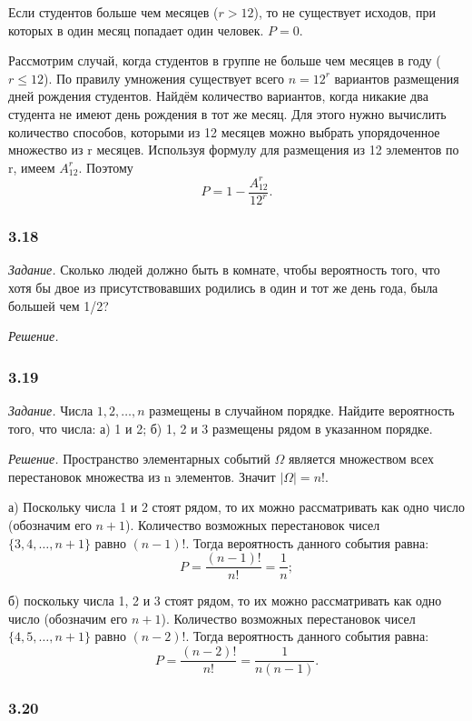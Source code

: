 \documentclass{book}
\begin{document}
Если студентов больше чем месяцев ($r>12$), то не существует исходов, при которых в один месяц попадает один человек. $P=0$.

Рассмотрим случай, когда студентов в группе не больше чем месяцев в году ($r\leq 12$). По правилу умножения существует всего $n=12^r$ вариантов размещения дней рождения студентов. Найдём количество вариантов, когда никакие два студента не имеют день рождения в тот же месяц. Для этого нужно вычислить количество способов, которыми из 12 месяцев можно выбрать упорядоченное множество из r месяцев. Используя формулу для размещения из 12 элементов по r, имеем $A_{12}^r$. Поэтому $$P=1-\frac{A_{12}^r}{12^r}.$$

\subsubsection*{3.18}

\textit{Задание.} Сколько людей должно быть в комнате, чтобы вероятность того, что хотя бы двое из присутствовавших родились в один и тот же день года, была большей чем 1/2?

\textit{Решение.}

\subsubsection*{3.19}

\textit{Задание.} Числа $1, 2,  \dotsc , n$ размещены в случайном порядке. Найдите вероятность того, что числа: а) 1 и 2; б) 1, 2 и 3 размещены рядом в указанном порядке.

\textit{Решение.} Пространство элементарных событий $\Omega$ является множеством всех перестановок множества из n элементов. Значит $|\Omega|=n!$.

а) Поскольку числа 1 и 2 стоят рядом, то их можно рассматривать как одно число (обозначим его $n+1$). Количество возможных перестановок чисел $\{3, 4,  \dotsc , n+1\}$ равно $\left(n-1\right)!$. Тогда вероятность данного события равна: $$P=\frac{\left(n-1\right)!}{n!}=\frac{1}{n};$$

б) поскольку числа 1, 2 и 3 стоят рядом, то их можно рассматривать как одно число (обозначим его $n+1$). Количество возможных перестановок чисел $\{4, 5,  \dotsc , n+1\}$ равно $\left(n-2\right)!$. Тогда вероятность данного события равна: $$P=\frac{\left(n-2\right)!}{n!}=\frac{1}{n(n-1)}.$$

\subsubsection*{3.20}
\end{document}
